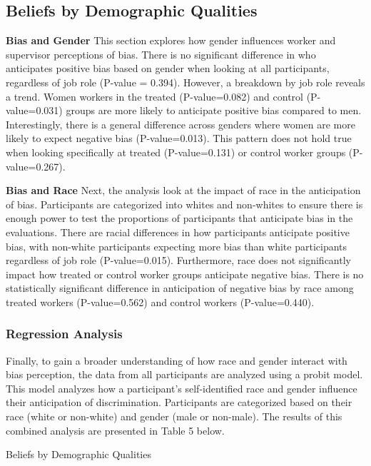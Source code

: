 \subsection{Beliefs by Demographic Qualities}
\textbf{Bias and Gender}
\newline
This section explores how gender influences worker and supervisor perceptions of bias. There is no significant difference in who anticipates positive bias based on gender when looking at all participants, regardless of job role (P-value = 0.394). However, a breakdown by job role reveals a trend. Women workers in the treated (P-value=0.082) and control (P-value=0.031) groups are more likely to anticipate positive bias compared to men. Interestingly, there is a general difference across genders where women are more likely to expect negative bias (P-value=0.013). This pattern does not hold true when looking specifically at treated (P-value=0.131) or control worker groups (P-value=0.267).

\textbf{Bias and Race}
\newline
Next, the analysis look at the impact of race in the anticipation of bias. Participants are categorized into whites and non-whites to ensure there is enough power to test the proportions of participants that anticipate bias in the evaluations. There are racial differences in how participants anticipate positive bias, with non-white participants expecting more bias than white participants regardless of job role (P-value=0.015). Furthermore, race does not significantly impact how treated or control worker groups anticipate negative bias. There is no statistically significant difference in anticipation of negative bias by race among treated workers (P-value=0.562) and control workers (P-value=0.440). 


\subsubsection{Regression Analysis}

Finally, to gain a broader understanding of how race and gender interact with bias perception, the data from all participants are analyzed using a probit model. This model analyzes how a participant's self-identified race and gender influence their anticipation of discrimination. Participants are categorized based on their race (white or non-white) and gender (male or non-male). The results of this combined analysis are presented in Table 5 below.

\begin{table}[H]
  \captionsetup{justification=raggedright,singlelinecheck=false}
   \caption{Beliefs by Demographic Qualities }
        
\end{table}

